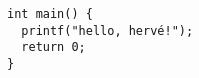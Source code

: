 \documentclass{article}
\begin{document}
\begin{verbatim}
int main() {
  printf("hello, hervé!");
  return 0;
}
\end{verbatim}
\end{document}
